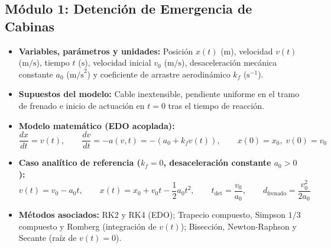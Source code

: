 \documentclass[a4paper,12pt]{article}
\begin{document}
\subsection{Módulo 1: Detención de Emergencia de Cabinas}
\begin{itemize}
    \item \textbf{Variables, parámetros y unidades:} Posición $x(t)$ ($\text{m}$), velocidad $v(t)$ ($\text{m/s}$), tiempo $t$ ($\text{s}$), velocidad inicial $v_0$ ($\text{m/s}$), desaceleración mecánica constante $a_0$ ($\text{m/s}^2$) y coeficiente de arrastre aerodinámico $k_f$ ($\text{s}^{-1}$).
    \item \textbf{Supuestos del modelo:} Cable inextensible, pendiente uniforme en el tramo de frenado e inicio de actuación en $t=0$ tras el tiempo de reacción.
    \item \textbf{Modelo matemático (EDO acoplada):}
    \begin{equation}
        \frac{dx}{dt} = v(t), \qquad \frac{dv}{dt} = -a(v,t) = -\left(a_0 + k_f v(t)\right), \qquad x(0)=x_0,\; v(0)=v_0
    \end{equation}
    \item \textbf{Caso analítico de referencia ($k_f = 0$, desaceleración constante $a_0 > 0$):}
    \begin{equation}
        v(t) = v_0 - a_0 t, \qquad x(t) = x_0 + v_0 t - \frac{1}{2}a_0 t^2, \qquad t_{\text{det}} = \frac{v_0}{a_0}, \qquad d_{\text{frenado}} = \frac{v_0^2}{2a_0}
    \end{equation}
    \item \textbf{Métodos asociados:} RK2 y RK4 (EDO); Trapecio compuesto, Simpson $1/3$ compuesto y Romberg (integración de $v(t)$); Bisección, Newton-Raphson y Secante (raíz de $v(t) = 0$).
\end{itemize}
\end{document}
